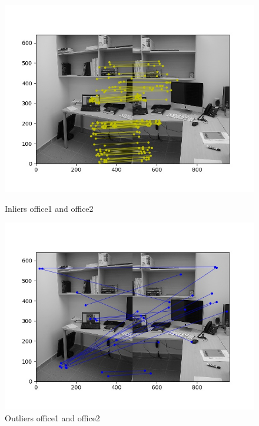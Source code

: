 \documentclass[12pt,a4paper]{report}
\begin{document}
\begin{figure}[!htb]
  \includegraphics[width=\linewidth]{outMatches_inlier_office1}
        \caption{Inliers office1 and office2}
\endminipage\hfill
{}
  \includegraphics[width=\linewidth]{outMatches_outlier_office1}
        \caption{Outliers office1 and office2}
\endminipage\hfill
\end{figure}
\end{document}
